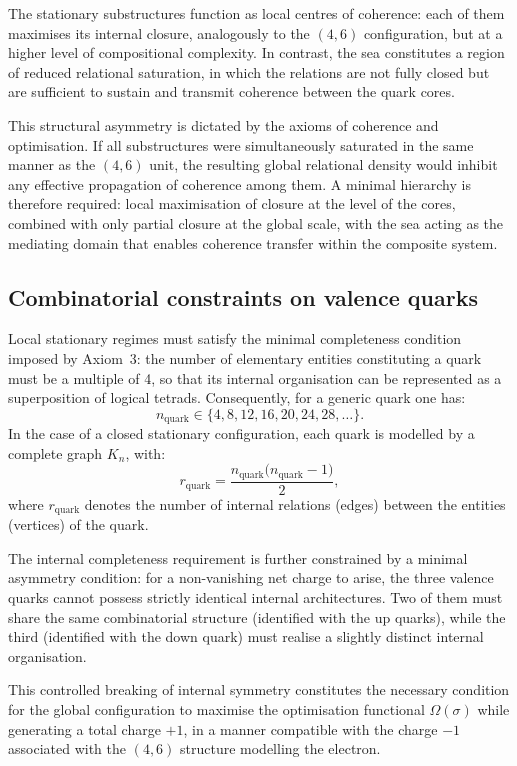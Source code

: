 \documentclass[11pt,a4paper]{article}
\begin{document}
The stationary substructures function as local centres of coherence: each of them maximises its internal closure, analogously to the \((4,6)\) configuration, but at a higher level of compositional complexity. In contrast, the sea constitutes a region of reduced relational saturation, in which the relations are not fully closed but are sufficient to sustain and transmit coherence between the quark cores. 

This structural asymmetry is dictated by the axioms of coherence and optimisation. If all substructures were simultaneously saturated in the same manner as the \((4,6)\) unit, the resulting global relational density would inhibit any effective propagation of coherence among them. A minimal hierarchy is therefore required: local maximisation of closure at the level of the cores, combined with only partial closure at the global scale, with the sea acting as the mediating domain that enables coherence transfer within the composite system.

\subsection{Combinatorial constraints on valence quarks}
Local stationary regimes must satisfy the minimal completeness condition imposed by Axiom~3: the number of elementary entities constituting a quark must be a multiple of 4, so that its internal organisation can be represented as a superposition of logical tetrads. Consequently, for a generic quark one has:
\[
n_{\mathrm{quark}} \in \{4, 8, 12, 16, 20, 24, 28, \ldots\}.
\]
In the case of a closed stationary configuration, each quark is modelled by a complete graph \(K_n\), with:
\[
r_{\mathrm{quark}} = \frac{n_{\mathrm{quark}}\bigl(n_{\mathrm{quark}} - 1\bigr)}{2},
\]
where \(r_{\mathrm{quark}}\) denotes the number of internal relations (edges) between the entities (vertices) of the quark.

The internal completeness requirement is further constrained by a minimal asymmetry condition: for a non-vanishing net charge to arise, the three valence quarks cannot possess strictly identical internal architectures. Two of them must share the same combinatorial structure (identified with the up quarks), while the third (identified with the down quark) must realise a slightly distinct internal organisation.

This controlled breaking of internal symmetry constitutes the necessary condition for the global configuration to maximise the optimisation functional \(\Omega(\sigma)\) while generating a total charge \(+1\), in a manner compatible with the charge \(-1\) associated with the \((4,6)\) structure modelling the electron.
\end{document}
